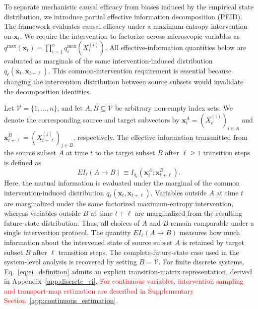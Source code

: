 \documentclass[fleqn,10pt]{wlscirep}
\newcommand{\rev}[1]{\textcolor{red}{#1}}
\theoremstyle{naturetheorem}
\begin{document}
To separate mechanistic causal efficacy from biases induced by the empirical
state distribution, we introduce partial effective information decomposition
(PEID). The framework evaluates causal efficacy under a maximum-entropy
intervention on \(\boldsymbol{x}_{t}\). We require the intervention to
factorize across microscopic variables as
\(q^{\max}(\boldsymbol{x}_{t})
=\prod_{i=1}^{n}q_i^{\max}(X_t^{(i)})\). All effective-information quantities below are evaluated as marginals of the
same intervention-induced distribution
\(q_{\ell}(\boldsymbol{x}_{t},\boldsymbol{x}_{t+\ell})\).
This common-intervention requirement is essential because changing the
intervention distribution between source subsets would invalidate the
decomposition identities.

Let \(\mathcal{V}=\{1,\ldots,n\}\), and let
\(A,B\subseteq\mathcal{V}\) be arbitrary non-empty index sets. We denote the
corresponding source and target subvectors by
\(\boldsymbol{x}_{t}^{A}=(X_t^{(i)})_{i\in A}\) and
\(\boldsymbol{x}_{t+\ell}^{B}=(X_{t+\ell}^{(j)})_{j\in B}\), respectively.
The effective information transmitted from the source subset \(A\) at time
\(t\) to the target subset \(B\) after \(\ell\geq1\) transition steps is
defined as
\begin{equation}
    EI_{\ell}(A\rightarrow B)
    \equiv
    I_{q_{\ell}}
    \left(
        \boldsymbol{x}_{t}^{A};
        \boldsymbol{x}_{t+\ell}^{B}
    \right).
    \label{eq:ei_definition}
\end{equation}
Here, the mutual information is evaluated under the marginal of the common
intervention-induced distribution
\(q_{\ell}(\boldsymbol{x}_{t},\boldsymbol{x}_{t+\ell})\).
Variables outside \(A\) at time \(t\) are marginalized under the same
factorized maximum-entropy intervention, whereas variables outside \(B\) at
time \(t+\ell\) are marginalized from the resulting future-state
distribution. Thus, all choices of \(A\) and \(B\) remain comparable under a
single intervention protocol. The quantity \(EI_{\ell}(A\rightarrow B)\) measures how much information about
the intervened state of source subset \(A\) is retained by target subset \(B\)
after \(\ell\) transition steps. The complete-future-state case used in the
system-level analysis is recovered by setting \(B=\mathcal{V}\). For finite
discrete systems, Eq.~\eqref{eq:ei_definition} admits an explicit
transition-matrix representation, derived in
Appendix~\ref{app:discrete_ei}. \rev{For continuous variables, intervention sampling and transport-map estimation are described in Supplementary Section~\ref{app:continuous_estimation}.}
\end{document}
